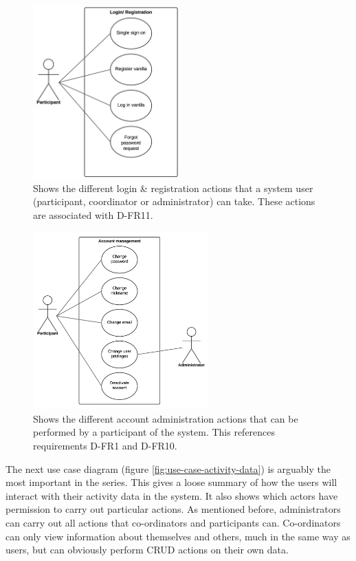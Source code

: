 \begin{figure}[H]
\centering
\includegraphics[width=0.5\textwidth]{../design/UML/UseCase/Login-Register.png}
\caption{Shows the different login \& registration actions that a system user (participant, coordinator or administrator) can take. These actions are associated with D-FR11.}
\label{fig:use-case-login}
\end{figure}

\begin{figure}[H]
\centering
\includegraphics[width=0.6\textwidth]{../design/UML/UseCase/Account-Management.png}
\caption{Shows the different account administration actions that can be performed by a participant of the system. This references requirements D-FR1 and D-FR10.}
\label{fig:use-case-account-admin}
\end{figure}

The next use case diagram (figure \ref{fig:use-case-activity-data}) is arguably the most important in the series. This gives a loose summary of how the users will interact with their activity data in the system. It also shows which actors have permission to carry out particular actions. As mentioned before, administrators can carry out all actions that co-ordinators and participants can. Co-ordinators can only view information about themselves and others, much in the same way as users, but can obviously perform CRUD actions on their own data.

